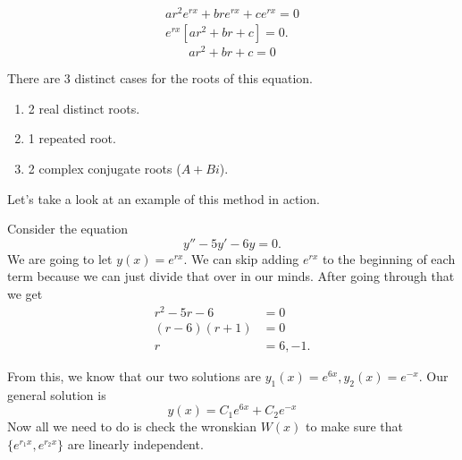   \begin{align*}
    ar^2e^{rx}+bre^{rx}+ce^{rx}=0\\
    e^{rx}[ar^2+br+c]=0
  .\end{align*}
  \[
    \boxed{ar^2+br+c=0}
  \]
  
  There are 3 distinct cases for the roots of this equation.
  \begin{enumerate}
    \item 2 real distinct roots.
    \item 1 repeated root.
    \item 2 complex conjugate roots ($A+Bi$).
  \end{enumerate}

  Let's take a look at an example of this method in action.

  \begin{problem}
    Consider the equation 
    \[
    y''-5y'-6y=0
    .\] 
    We are going to let $y(x)=e^{rx}$. We can skip adding $e^{rx}$ to the beginning of each term because we can just divide that over in our minds. After going through that we get 
    \begin{align*}
      r^2-5r-6&=0\\
      (r-6)(r+1)&=0\\
      r&=6,-1
    .\end{align*}
    
    From this, we know that our two solutions are $y_1(x)=e^{6x},y_2(x)=e^{-x}$. Our general solution is 
    \[
      \boxed{y(x)=C_1 e^{6x}+C_2e^{-x}}
    \]
    Now all we need to do is check the wronskian $W(x)$ to make sure that $\{e^{r_1x},e^{r_2x}\}$ are linearly independent.
  \end{problem}

